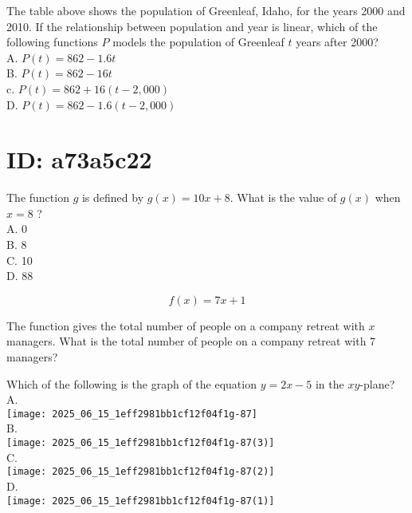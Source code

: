 The table above shows the population of Greenleaf, Idaho, for the years 2000 and 2010. If the relationship between population and year is linear, which of the following functions $P$ models the population of Greenleaf $t$ years after 2000?\\
A. $P(t)=862-1.6 t$\\
B. $P(t)=862-16 t$\\
c. $P(t)=862+16(t-2,000)$\\
D. $P(t)=862-1.6(t-2,000)$

\section*{ID: a73a5c22}
The function $g$ is defined by $g(x)=10 x+8$. What is the value of $g(x)$ when $x=8$ ?\\
A. 0\\
B. 8\\
C. 10\\
D. 88

$$
f(x)=7 x+1
$$

The function gives the total number of people on a company retreat with $x$ managers. What is the total number of people on a company retreat with 7 managers?

Which of the following is the graph of the equation $y=2 x-5$ in the $x y$-plane?\\
A.\\
\texttt{[image: 2025\_06\_15\_1eff2981bb1cf12f04f1g-87]}\\
B.\\
\texttt{[image: 2025\_06\_15\_1eff2981bb1cf12f04f1g-87(3)]}\\
C.\\
\texttt{[image: 2025\_06\_15\_1eff2981bb1cf12f04f1g-87(2)]}\\
D.\\
\texttt{[image: 2025\_06\_15\_1eff2981bb1cf12f04f1g-87(1)]}


